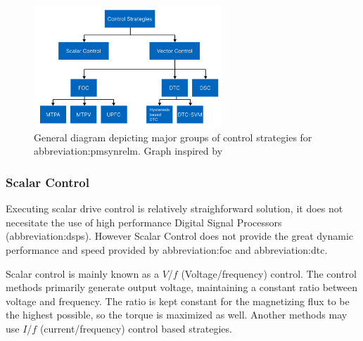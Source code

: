 \documentclass[a4paper, twoside, 11pt]{article}
\begin{document}
        \begin{figure}[htbp!]
            \centering
            \includegraphics[width=0.63\textwidth]{src/png/pmsynrelm-control-strategies.png}
            \caption{General diagram depicting major groups of control strategies for \gls{abbreviation:pmsynrelm}. Graph inspired by \cite{dwivedi-review-on-control-strategies-of-permanent-magnet-assisted-synchronous-reluctance-motor-drive}}
            \label{fig:pmsynrelm-control-strategies}
        \end{figure}

        \subsubsection{Scalar Control}
            Executing scalar drive control is relatively straighforward solution, it does not necesitate the use of high performance Digital Signal Processors (\gls{abbreviation:dsp}s). However Scalar Control does not provide the great dynamic performance and speed provided by \gls{abbreviation:foc} and \gls{abbreviation:dtc}. \cite{dwivedi-review-on-control-strategies-of-permanent-magnet-assisted-synchronous-reluctance-motor-drive}\par
            Scalar control is mainly known as a $V$/$f$ (Voltage/frequency) control. The control methods primarily generate output voltage, maintaining a constant ratio between voltage and frequency. The ratio is kept constant for the magnetizing flux to be the highest possible, so the torque is maximized as well. Another methods may use $I$/$f$ (current/frequency) control based strategies. \cite{heidari-a-review-of-synchronour-relucatence-motor-drive-advancements}
\end{document}
